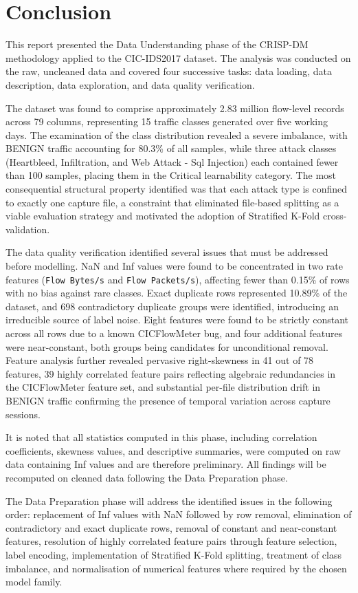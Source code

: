 \documentclass[12pt,a4paper]{article}
\begin{document}
\section{Conclusion}

This report presented the Data Understanding phase of the CRISP-DM methodology applied
to the CIC-IDS2017 dataset. The analysis was conducted on the raw, uncleaned data and
covered four successive tasks: data loading, data description, data exploration, and
data quality verification.

The dataset was found to comprise approximately 2.83 million flow-level records across
79 columns, representing 15 traffic classes generated over five working days. The
examination of the class distribution revealed a severe imbalance, with BENIGN traffic
accounting for 80.3\% of all samples, while three attack classes (Heartbleed,
Infiltration, and Web Attack - Sql Injection) each contained fewer than 100 samples,
placing them in the Critical learnability category. The most consequential structural
property identified was that each attack type is confined to exactly one capture file,
a constraint that eliminated file-based splitting as a viable evaluation strategy and
motivated the adoption of Stratified K-Fold cross-validation.

The data quality verification identified several issues that must be addressed before
modelling. NaN and Inf values were found to be concentrated in two rate features
(\texttt{Flow Bytes/s} and \texttt{Flow Packets/s}), affecting fewer than 0.15\% of
rows with no bias against rare classes. Exact duplicate rows represented 10.89\% of
the dataset, and 698 contradictory duplicate groups were identified, introducing an
irreducible source of label noise. Eight features were found to be strictly constant
across all rows due to a known CICFlowMeter bug, and four additional features were
near-constant, both groups being candidates for unconditional removal. Feature analysis
further revealed pervasive right-skewness in 41 out of 78 features, 39 highly correlated
feature pairs reflecting algebraic redundancies in the CICFlowMeter feature set, and
substantial per-file distribution drift in BENIGN traffic confirming the presence of
temporal variation across capture sessions.

It is noted that all statistics computed in this phase, including correlation
coefficients, skewness values, and descriptive summaries, were computed on raw data
containing Inf values and are therefore preliminary. All findings will be recomputed
on cleaned data following the Data Preparation phase.

The Data Preparation phase will address the identified issues in the following order:
replacement of Inf values with NaN followed by row removal, elimination of contradictory
and exact duplicate rows, removal of constant and near-constant features, resolution of
highly correlated feature pairs through feature selection, label encoding, implementation
of Stratified K-Fold splitting, treatment of class imbalance, and normalisation of
numerical features where required by the chosen model family.
\end{document}
